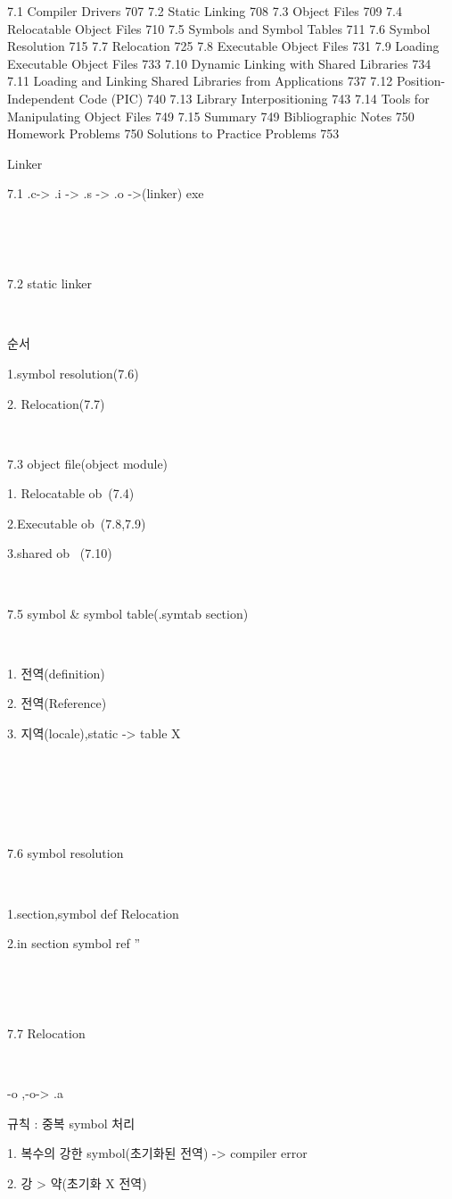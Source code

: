 7.1 Compiler Drivers 707
7.2 Static Linking 708
7.3 Object Files 709
7.4 Relocatable Object Files 710
7.5 Symbols and Symbol Tables 711
7.6 Symbol Resolution 715
7.7 Relocation 725
7.8 Executable Object Files 731
7.9 Loading Executable Object Files 733
7.10 Dynamic Linking with Shared Libraries 734
7.11 Loading and Linking Shared Libraries from Applications 737
7.12 Position-Independent Code (PIC) 740
7.13 Library Interpositioning 743
7.14 Tools for Manipulating Object Files 749
7.15 Summary 749
Bibliographic Notes 750
Homework Problems 750
Solutions to Practice Problems 753


Linker

7.1 .c-> .i -> .s -> .o ->(linker) exe

​

​

7.2 static linker

​

순서

1.symbol resolution(7.6)

2. Relocation(7.7)

​

7.3 object file(object module)

1. Relocatable ob~(7.4)

2.Executable ob~(7.8,7.9)

3.shared ob~ (7.10)

​

7.5 symbol & symbol table(.symtab section)

​

1. 전역(definition)

2. 전역(Reference)

3. 지역(locale),static -> table X

​

​

​

7.6 symbol resolution

​

1.section,symbol def Relocation

2.in section symbol ref ''

​

​

7.7 Relocation

​

-o ,-o-> .a

규칙 : 중복 symbol 처리

1. 복수의 강한 symbol(초기화된 전역) -> compiler error

2. 강 > 약(초기화 X 전역)

